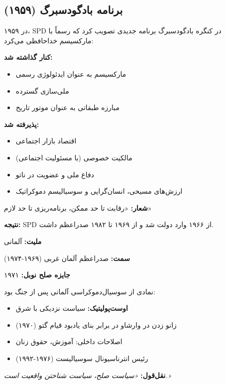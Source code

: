 \subsection{برنامه بادگودسبرگ (۱۹۵۹)}

\begin{historybox}
در ۱۹۵۹، SPD در کنگره بادگودسبرگ برنامه جدیدی تصویب کرد که رسماً با مارکسیسم خداحافظی می‌کرد:

\textbf{کنار گذاشته شد:}
\begin{itemize}[nosep]
    \item مارکسیسم به عنوان ایدئولوژی رسمی
    \item ملی‌سازی گسترده
    \item مبارزه طبقاتی به عنوان موتور تاریخ
\end{itemize}

\textbf{پذیرفته شد:}
\begin{itemize}[nosep]
    \item اقتصاد بازار اجتماعی
    \item مالکیت خصوصی (با مسئولیت اجتماعی)
    \item دفاع ملی و عضویت در ناتو
    \item ارزش‌های مسیحی، انسان‌گرایی و سوسیالیسم دموکراتیک
\end{itemize}

\textbf{شعار:} «رقابت تا حد ممکن، برنامه‌ریزی تا حد لازم»

\textbf{نتیجه:} SPD از ۱۹۶۶ وارد دولت شد و از ۱۹۶۹ تا ۱۹۸۲ صدراعظم داشت.
\end{historybox}

\begin{personbox}

\textbf{ملیت:} آلمانی

\textbf{سمت:} صدراعظم آلمان غربی (۱۹۶۹-۱۹۷۴)

\textbf{جایزه صلح نوبل:} ۱۹۷۱

\mediumspace

 نمادی از سوسیال‌دموکراسی آلمانی پس از جنگ بود:

\begin{itemize}[nosep]
    \item \textbf{اوست‌پولیتیک:} سیاست نزدیکی با شرق
    \item زانو زدن در وارشاو در برابر بنای یادبود قیام گتو (۱۹۷۰)
    \item اصلاحات داخلی: آموزش، حقوق زنان
    \item رئیس انترناسیونال سوسیالیست (۱۹۷۶-۱۹۹۲)
\end{itemize}

\mediumspace

\textbf{نقل‌قول:} \textit{«سیاست صلح، سیاست شناختن واقعیت است.»}
\end{personbox}

